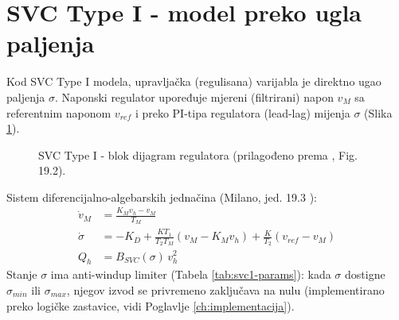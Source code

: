\documentclass[11pt,a4paper]{report}
\begin{document}
\section{SVC Type I - model preko ugla paljenja}

Kod SVC Type I modela, upravljačka (regulisana) varijabla je direktno ugao paljenja
$\sigma$. Naponski regulator upoređuje mjereni (filtrirani) napon $v_M$ sa referentnim
naponom $v_{ref}$ i preko PI-tipa regulatora (lead-lag) mijenja $\sigma$ (Slika
\ref{fig:svc1-block}).

\begin{figure}[H]
\centering
{}
\caption{SVC Type I - blok dijagram regulatora (prilagođeno prema \cite{milano2010psms}, Fig. 19.2).}
\label{fig:svc1-block}
\end{figure}

Sistem diferencijalno-algebarskih jednačina (Milano, jed. 19.3 \cite{milano2010psms}):
\begin{align}
\dot{v}_M &= \frac{K_M v_h - v_M}{T_M} \label{eq:svc1-vm}\\
\dot{\sigma} &= -K_D + \frac{K T_1}{T_2 T_M}\left(v_M - K_M v_h\right) + \frac{K}{T_2}\left(v_{ref} - v_M\right) \label{eq:svc1-sigma}\\
Q_h &= B_{SVC}(\sigma)\, v_h^2 \label{eq:svc1-q}
\end{align}
Stanje $\sigma$ ima anti-windup limiter (Tabela \ref{tab:svc1-params}): kada $\sigma$
dostigne $\sigma_{min}$ ili $\sigma_{max}$, njegov izvod se privremeno zaključava na nulu
(implementirano preko logičke zastavice, vidi Poglavlje \ref{ch:implementacija}).
\end{document}
